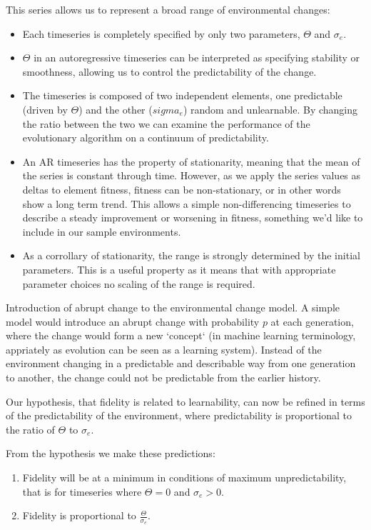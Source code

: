 \documentclass[]{report}
\begin{document}
This series allows us to represent a broad range of environmental changes:

\begin{itemize}

	\item Each timeseries is completely specified by only two parameters, $\Theta$ and $\sigma_e$.
	\item $\Theta$ in an autoregressive timeseries can be interpreted as specifying stability or smoothness, allowing us to control the predictability of the change.
	\item The timeseries is composed of two independent elements, one predictable (driven by $\Theta$) and the other ($sigma_e$) random and unlearnable. By changing the ratio between the two we can examine the performance of the evolutionary algorithm on a continuum of predictability.
	\item An AR timeseries has the property of stationarity, meaning that the mean of the series is constant through time. However, as we apply the series values as deltas to element fitness, fitness can be non-stationary, or in other words show a long term trend. This allows a simple non-differencing timeseries to describe a steady improvement or worsening in fitness, something we'd like to include in our sample environments.
	\item As a corrollary of stationarity, the range is strongly determined by the initial parameters. This is a useful property as it means that with appropriate parameter choices no scaling of the range is required. 
\end{itemize}

Introduction of abrupt change to the environmental change model. A simple model would introduce an abrupt change with probability $p$ at each generation, where the change would form a new `concept` (in machine learning terminology, appriately as evolution can be seen as a learning system). Instead of the environment changing in a predictable and describable way from one generation to another, the change could not be predictable from the earlier history.

Our hypothesis, that fidelity is related to learnability, can now be refined in terms of the predictability of the environment, where predictability is proportional to the ratio of $\Theta$ to $\sigma_e$.

From the hypothesis we make these predictions:
\begin{enumerate}
	\item Fidelity will be at a minimum in conditions of maximum unpredictability, that is for timeseries where $\Theta=0$ and $\sigma_e>0$.
	\item Fidelity is proportional to $\frac{\Theta}{\sigma_e}$.
\end{enumerate}
	
\end{document}

